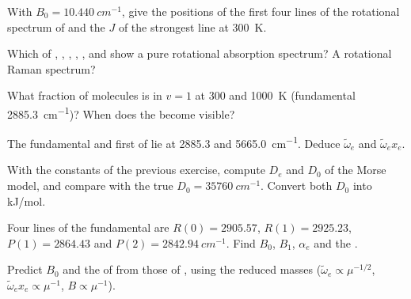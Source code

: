 \begin{exercise}[$\star$]\label{exo:b3:rovibrational-spectroscopy:2}
With $B_0 = \qty{10.440}{cm^{-1}}$, give the positions of the first four lines of
the rotational spectrum of  and the $J$ of the strongest line at
\qty{300}{K}.
\end{exercise}

\begin{exercise}[$\star$]\label{exo:b3:rovibrational-spectroscopy:3}
Which of , , , , ,  and  show a pure
rotational absorption spectrum? A rotational Raman spectrum?
\end{exercise}

\begin{exercise}[$\star$]\label{exo:b3:rovibrational-spectroscopy:4}
What fraction of  molecules is in $v = 1$ at 300 and \qty{1000}{K}
(fundamental \qty{2885.3}{cm^{-1}})? When does the  become visible?
\end{exercise}

\begin{exercise}[$\star\star$]\label{exo:b3:rovibrational-spectroscopy:5}
The fundamental and first  of  lie at 2885.3 and
\qty{5665.0}{cm^{-1}}. Deduce $\tilde\omega_e$ and $\tilde\omega_ex_e$.
\end{exercise}

\begin{exercise}[$\star\star$]\label{exo:b3:rovibrational-spectroscopy:6}
With the constants of the previous exercise, compute $D_e$ and $D_0$ of the
Morse model, and compare with the true $D_0 = \qty{35760}{cm^{-1}}$. Convert both
$D_0$ into \unit{kJ/mol}.
\end{exercise}

\begin{exercise}[$\star\star$]\label{exo:b3:rovibrational-spectroscopy:7}
Four lines of the  fundamental are $R(0) = 2905.57$, $R(1) = 2925.23$,
$P(1) = 2864.43$ and $P(2) = \qty{2842.94}{cm^{-1}}$. Find $B_0$, $B_1$, $\alpha_e$ and
the .
\end{exercise}

\begin{exercise}[$\star\star$]\label{exo:b3:rovibrational-spectroscopy:8}
Predict $B_0$ and the  of  from those of , using
the reduced masses ($\tilde\omega_e \propto \mu^{-1/2}$, $\tilde\omega_ex_e \propto
\mu^{-1}$, $B \propto \mu^{-1}$).
\end{exercise}

